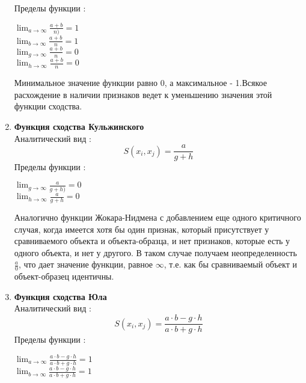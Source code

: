 \documentclass[a4paper,12pt]{article}
\begin{document}
\begin{flushleft}
\begin{enumerate}
					Пределы функции :					 													\begin{center}
						${\lim_{a\to \infty} \frac{a+b}{n)}=1}$
						\\					
						\medskip						
						${\lim_{b\to \infty} \frac{a+b}{n}=1}$
						\\
						\medskip						
						${\lim_{g\to \infty} \frac{a+b}{n}=0}$
						\\
						\medskip
						${\lim_{h\to \infty} \frac{a+b}{n}=0}$
						\\
						\medskip											
					\end{center}
					Минимальное значение функции равно 0, а максимальное - 1.Всякое расхождение в наличии признаков ведет к уменьшению значения этой функции сходства.					\item \textbf{Функция сходства Кульжинского}
				\\ Аналитический вид :
					\begin{equation}
						S(x_i,x_j) = \frac{a}{g+h} 
					\end{equation}
					Пределы функции :
					\begin{center}
						${\lim_{g\to \infty} \frac{a}{g+h)}=0}$
						\\					
						\medskip						
						${\lim_{h\to \infty} \frac{a}{g+h}=0}$
						\\
						\medskip
					\end{center}
					Аналогично функции Жокара-Нидмена с добавлением еще одного критичного случая, когда имеется хотя бы один признак, который присутствует у сравниваемого объекта и объекта-образца, и нет признаков, которые есть у одного объекта, и нет у другого.
					В таком случае получаем неопределенность ${\frac{a}{0}}$, что дает значение функции, равное ${\infty}$, т.е. как бы сравниваемый объект и объект-образец идентичны.
			\item \textbf{Функция сходства Юла}
				\\ Аналитический вид :
					\begin{equation}
						S(x_i,x_j) = \frac{a\cdot b-g\cdot h}{a\cdot b+g\cdot h} 
					\end{equation}
					Пределы функции :																		\\
					\medskip
					\begin{center}
						${\lim_{a\to \infty} \frac{a\cdot b-g\cdot h}{a\cdot b+g\cdot h}=1}$
						\\					
						\medskip						
						${\lim_{b\to \infty} \frac{a\cdot b-g\cdot h}{a\cdot b+g\cdot h}=1}$
						\\

\end{center}
\end{enumerate}
\end{flushleft}
\end{document}
